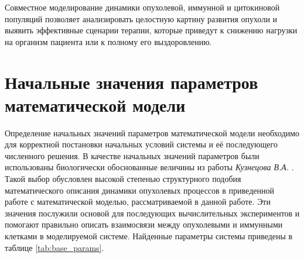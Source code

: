 Совместное моделирование динамики опухолевой, иммунной и цитокиновой популяций
позволяет анализировать целостную картину развития опухоли и выявить
эффективные сценарии терапии, которые приведут к снижению нагрузки на организм
пациента или к полному его выздоровлению.

\section{Начальные значения параметров математической модели}

Определение начальных значений параметров математической модели необходимо для
корректной постановки начальных условий системы и её последующего численного решения.
В качестве начальных значений параметров были использованы биологически
обоснованные величины из работы \textit{Кузнецова В.А.} \cite{Kuznetsov1994}.
Такой выбор обусловлен высокой степенью структурного подобия математического
описания динамики опухолевых процессов в приведенной работе с математической
моделью, рассматриваемой в данной работе. Эти значения послужили основой для
последующих вычислительных экспериментов и помогают правильно описать
взаимосвязи между опухолевыми и иммунными клетками в моделируемой системе.
Найденные параметры системы приведены в таблице \ref{tab:base_params}.

